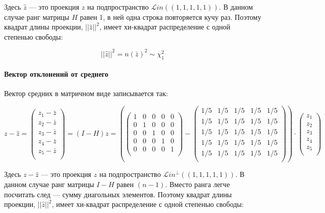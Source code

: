 \documentclass[11pt,russian,]{article}
\let\oldparagraph\paragraph
\renewcommand{\paragraph}[1]{\oldparagraph{#1}\mbox{}}
\newcommand{\1}{\mathbbm{1}}
\newcommand{\Lin}{\mathcal{L}in}
\newcommand{\Linp}{\Lin^{\perp}}
\begin{document}
Здесь \(\hat z\) --- это проекция \(z\) на подпространство
\(\Lin((1, 1, 1, 1, 1))\). В данном случае ранг матрицы \(H\) равен 1, в
ней одна строка повторяется кучу раз. Поэтому квадрат длины проекции,
\(||\hat z||^2\), имеет хи-квадрат распределение с одной степенью
свободы:

\[
||\hat z||^2 = n(\bar z)^2 \sim \chi^2_1
\]

\paragraph{Вектор отклонений от среднего}\label{---}

Вектор средних в матричном виде записывается так:

\[
z - \hat z =
\begin{pmatrix}
z_1 - \bar z \\
z_2 - \bar z \\
z_3 - \bar z \\
z_4 - \bar z \\
z_5 - \bar z \\
\end{pmatrix} =
(I-H)z=
\left(
\begin{pmatrix}
1 & 0 & 0 & 0 & 0 \\
0 & 1 & 0 & 0 & 0 \\
0 & 0 & 1 & 0 & 0 \\
0 & 0 & 0 & 1 & 0 \\
0 & 0 & 0 & 0 & 1 \\
\end{pmatrix} -
\begin{pmatrix}
1/5 & 1/5 & 1/5 & 1/5 & 1/5 \\
1/5 & 1/5 & 1/5 & 1/5 & 1/5 \\
1/5 & 1/5 & 1/5 & 1/5 & 1/5 \\
1/5 & 1/5 & 1/5 & 1/5 & 1/5 \\
1/5 & 1/5 & 1/5 & 1/5 & 1/5 \\
\end{pmatrix}
\right)
\cdot
\begin{pmatrix}
z_1 \\
z_2 \\
z_3 \\
z_4 \\
z_5 \\
\end{pmatrix}
\]

Здесь \(z - \hat z\) --- это проекция \(z\) на подпространство
\(\Linp((1, 1, 1, 1, 1))\). В данном случае ранг матрицы \(I-H\) равен
\((n-1)\). Вместо ранга легче посчитать след --- сумму диагольных
элементов. Поэтому квадрат длины проекции, \(||\hat z||^2\), имеет
хи-квадрат распределение с одной степенью свободы:
\end{document}
